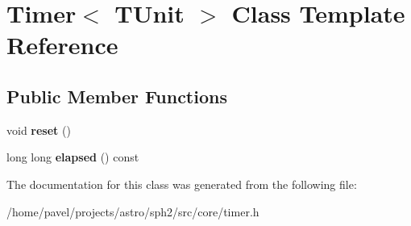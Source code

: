 \hypertarget{classTimer}{}\section{Timer$<$ T\+Unit $>$ Class Template Reference}
\label{classTimer}
\subsection*{Public Member Functions}
\begin{DoxyCompactItemize}
\item 
\hypertarget{classTimer_afb7a4d8373d578d042821b460c47bb2d}{}\label{classTimer_afb7a4d8373d578d042821b460c47bb2d} 
void {\bfseries reset} ()
\item 
\hypertarget{classTimer_abdac528b1b2b1ebd1486c707131919f8}{}\label{classTimer_abdac528b1b2b1ebd1486c707131919f8} 
long long {\bfseries elapsed} () const
\end{DoxyCompactItemize}


The documentation for this class was generated from the following file\+:\begin{DoxyCompactItemize}
\item 
/home/pavel/projects/astro/sph2/src/core/timer.\+h\end{DoxyCompactItemize}
